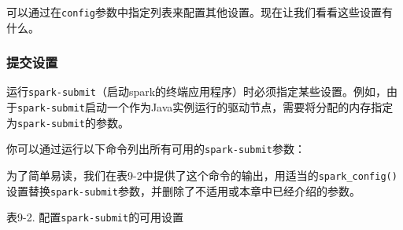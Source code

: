 \documentclass[
]{article}
\newenvironment{Shaded}{\begin{snugshade}}{\end{snugshade}}
\newcommand{\KeywordTok}[1]{\textcolor[rgb]{0.13,0.29,0.53}{\textbf{#1}}}
\newcommand{\NormalTok}[1]{#1}
\newcommand{\OperatorTok}[1]{\textcolor[rgb]{0.81,0.36,0.00}{\textbf{#1}}}
\newcommand{\StringTok}[1]{\textcolor[rgb]{0.31,0.60,0.02}{#1}}
\begin{document}
可以通过在\texttt{config}参数中指定列表来配置其他设置。现在让我们看看这些设置有什么。

\hypertarget{ux63d0ux4ea4ux8bbeux7f6e}{%
\subsubsection{提交设置}\label{ux63d0ux4ea4ux8bbeux7f6e}}

运行\texttt{spark-submit}（启动spark的终端应用程序）时必须指定某些设置。例如，由于\texttt{spark-submit}启动一个作为Java实例运行的驱动节点，需要将分配的内存指定为\texttt{spark-submit}的参数。

你可以通过运行以下命令列出所有可用的\texttt{spark-submit}参数：

\begin{Shaded}
\end{Shaded}

为了简单易读，我们在表9-2中提供了这个命令的输出，用适当的\texttt{spark\_config()}设置替换\texttt{spark-submit}参数，并删除了不适用或本章中已经介绍的参数。

表9-2. 配置\texttt{spark-submit}的可用设置
\end{document}
